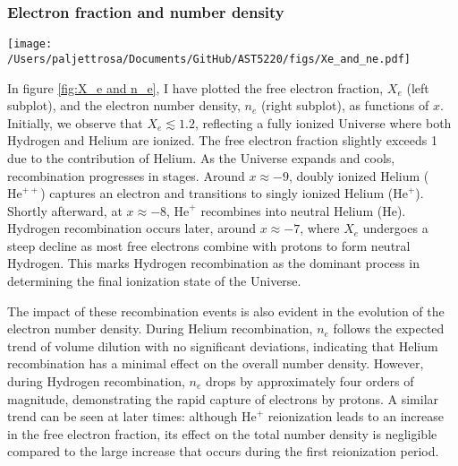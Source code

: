 \documentclass{aa}
\numberwithin{equation}{section}
\numberwithin{table}{section}
\numberwithin{figure}{section}
\begin{document}
\subsubsection{Electron fraction and number density}

\begin{figure*}
  \centering
  \texttt{[image: /Users/paljettrosa/Documents/GitHub/AST5220/figs/Xe\_and\_ne.pdf]}
  \caption{The evolution of the free electron fraction $X_e$ (left) and the free electron number density $n_e$ (right) as functions of $x = \log(a)$. The dashed blue line marks the time of recombination estimated using only the Saha approximation, while the solid line shows the result from solving the Peebles equation. The significant difference illustrates the limitations of assuming equilibrium. 
  }\label{fig:X_e and n_e}
\end{figure*}

In figure \ref{fig:X_e and n_e}, I have plotted the free electron fraction, $X_e$ (left subplot), and the electron number density, $n_e$ (right subplot), as functions of $x$. Initially, we observe that $X_e \lesssim 1.2$, reflecting a fully ionized Universe where both Hydrogen and Helium are ionized. The free electron fraction slightly exceeds 1 due to the contribution of Helium. As the Universe expands and cools, recombination progresses in stages. Around $x \approx -9$, doubly ionized Helium ($\text{He}^{++}$) captures an electron and transitions to singly ionized Helium ($\text{He}^+$). Shortly afterward, at $x \approx -8$, $\text{He}^{+}$ recombines into neutral Helium ($\text{He}$). Hydrogen recombination occurs later, around $x \approx -7$, where $X_e$ undergoes a steep decline as most free electrons combine with protons to form neutral Hydrogen. This marks Hydrogen recombination as the dominant process in determining the final ionization state of the Universe.

The impact of these recombination events is also evident in the evolution of the electron number density. During Helium recombination, $n_e$ follows the expected trend of volume dilution with no significant deviations, indicating that Helium recombination has a minimal effect on the overall number density. However, during Hydrogen recombination, $n_e$ drops by approximately four orders of magnitude, demonstrating the rapid capture of electrons by protons. A similar trend can be seen at later times: although $\text{He}^{+}$ reionization leads to an increase in the free electron fraction, its effect on the total number density is negligible compared to the large increase that occurs during the first reionization period.
\end{document}
